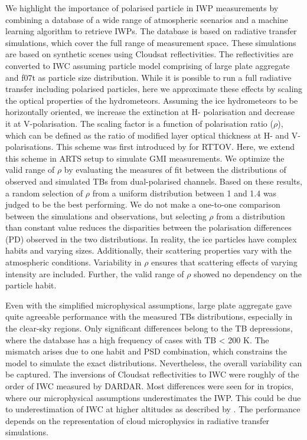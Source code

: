 \documentclass[amt, manuscript]{copernicus}
\begin{document}
We highlight the importance of polarised particle in IWP measurements by combining a database of a wide range of atmospheric scenarios and a machine learning algorithm to retrieve IWPs. The database is based on radiative transfer simulations, which  cover the full range of measurement space. These simulations are based on synthetic scenes using Cloudsat reflectivities. The reflectivities are converted to IWC assuming particle model comprising of large plate aggregate and f07t as particle size distribution. While it is possible to run a full radiative transfer including polarised particles, here we approximate these effects by scaling the optical properties of the hydrometeors. Assuming the ice hydrometeors to be horizontally oriented, we increase the extinction at H- polarisation and decrease it at V-polarisation. The scaling factor is a function of polarisation ratio ($\rho$), which can be defined as the ratio of modified layer optical thickness at H- and V- polarisations. This scheme was first introduced by \citet{barlakas:intro:21} for RTTOV. Here, we extend this scheme in ARTS setup to simulate GMI measurements. We optimize the valid range of $\rho$ by evaluating the measures of fit between the distributions of observed and simulated TBs from dual-polarised channels. Based on these results, a random selection of $\rho$ from a uniform distribution between 1 and 1.4  was judged to be the best performing. We do not make a one-to-one comparison between the simulations and observations, but selecting $\rho$ from a distribution than constant value reduces the disparities between the polarisation differences (PD) observed in the two distributions. In reality, the ice particles have complex habits and varying sizes. Additionally, their scattering properties vary with the atmospheric conditions. Variability in $\rho$ ensures that scattering effects of varying intensity are included. Further, the valid range of $\rho$ showed no dependency on the particle habit. 

Even with the simplified microphysical assumptions, large plate aggregate gave quite agreeable performance with  the measured TBs distributions, especially in the clear-sky regions. Only significant differences belong to the TB depressions, where the database has a high frequency of cases with TB < 200\,\,K. The mismatch arises due to one habit and PSD combination, which constrains the model to simulate the exact distributions. Nevertheless, the overall variability can be captured. The inversions of Cloudsat reflectivities to IWC were roughly of the order of IWC measured by DARDAR. Most differences were seen for in tropics, where our microphysical assumptions underestimates the IWP. This could be due to underestimation of IWC at higher altitudes as described by \citet{ekelund2020using}. The performance depends on the representation of cloud microphysics in radiative transfer simulations.  
\end{document}
